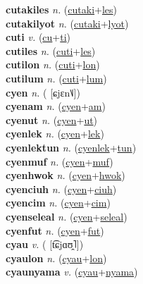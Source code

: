 \textbf{cutakiles} \textit{n.} (\hyperref[cutaki]{cutaki}+\hyperref[les]{les})
 \label{cutakiles} \\
\textbf{cutakilyot} \textit{n.} (\hyperref[cutaki]{cutaki}+\hyperref[lyot]{lyot})
 \label{cutakilyot} \\
\textbf{cuti} \textit{v.} (\hyperref[cu]{cu}+\hyperref[ti]{ti})
 \label{cuti} \\
\textbf{cutiles} \textit{n.} (\hyperref[cuti]{cuti}+\hyperref[les]{les})
 \label{cutiles} \\
\textbf{cutilon} \textit{n.} (\hyperref[cuti]{cuti}+\hyperref[lon]{lon})
 \label{cutilon} \\
\textbf{cutilum} \textit{n.} (\hyperref[cuti]{cuti}+\hyperref[lum]{lum})
 \label{cutilum} \\
\textbf{cyen} \textit{n.} ( [ɕjɛn˥˩])
 \label{cyen} \\
\textbf{cyenam} \textit{n.} (\hyperref[cyen]{cyen}+\hyperref[am]{am})
 \label{cyenam} \\
\textbf{cyenut} \textit{n.} (\hyperref[cyen]{cyen}+\hyperref[ut]{ut})
 \label{cyenut} \\
\textbf{cyenlek} \textit{n.} (\hyperref[cyen]{cyen}+\hyperref[lek]{lek})
 \label{cyenlek} \\
\textbf{cyenlektun} \textit{n.} (\hyperref[cyenlek]{cyenlek}+\hyperref[tun]{tun})
 \label{cyenlektun} \\
\textbf{cyenmuf} \textit{n.} (\hyperref[cyen]{cyen}+\hyperref[muf]{muf})
 \label{cyenmuf} \\
\textbf{cyenhwok} \textit{n.} (\hyperref[cyen]{cyen}+\hyperref[hwok]{hwok})
 \label{cyenhwok} \\
\textbf{cyenciuh} \textit{n.} (\hyperref[cyen]{cyen}+\hyperref[ciuh]{ciuh})
 \label{cyenciuh} \\
\textbf{cyencim} \textit{n.} (\hyperref[cyen]{cyen}+\hyperref[cim]{cim})
 \label{cyencim} \\
\textbf{cyenseleal} \textit{n.} (\hyperref[cyen]{cyen}+\hyperref[seleal]{seleal})
 \label{cyenseleal} \\
\textbf{cyenfut} \textit{n.} (\hyperref[cyen]{cyen}+\hyperref[fut]{fut})
 \label{cyenfut} \\
\textbf{cyau} \textit{v.} ( [t͡ɕjɑʊ̯˥])
 \label{cyau} \\
\textbf{cyaulon} \textit{n.} (\hyperref[cyau]{cyau}+\hyperref[lon]{lon})
 \label{cyaulon} \\
\textbf{cyaunyama} \textit{v.} (\hyperref[cyau]{cyau}+\hyperref[nyama]{nyama})
 \label{cyaunyama} \\
